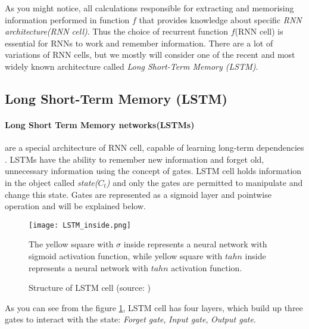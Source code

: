 As you might notice, all calculations responsible for extracting and
memorising information performed in function $f$ that provides knowledge about
specific \emph{RNN architecture(RNN cell)}.
Thus the choice of recurrent function $f$(\gls{RNN} cell)
is essential for RNNs to work and remember information. There are a lot of variations
of RNN cells, but we mostly will consider one of the recent and
most widely known architecture called \emph{Long Short-Term Memory (\gls{LSTM})}.


\subsection{Long Short-Term Memory (\gls{LSTM})}
\paragraph{Long Short Term Memory networks(LSTMs)} are a special architecture of RNN cell,
capable of learning long-term dependencies \cite{Hochreiter:1997:LSM:1246443.1246450}.
LSTMs have the ability to remember new information and forget old, unnecessary information
using the concept of gates. LSTM cell holds information in the object called \emph{state($C_t$)}
and only the gates are permitted to manipulate and change this state.
Gates are represented as a sigmoid layer and pointwise operation and will be explained
below.

\begin{figure}[H]
	\texttt{[image: LSTM\_inside.png]}
	\caption{
		Structure of LSTM cell (source: \cite{ColahChristopher2015})}
		\medskip
		\small
		The yellow square with $\sigma$ inside represents a neural
		network with sigmoid activation function, while yellow square with $tahn$ inside represents
		a neural network with $tahn$ activation function.
	\label{img:lstm} %
\end{figure}


As you can see from the figure \ref{img:lstm}, LSTM cell has four layers,
which build up three gates to interact with the state:
\emph{Forget gate}, \emph{Input gate}, \emph{Output gate}.


